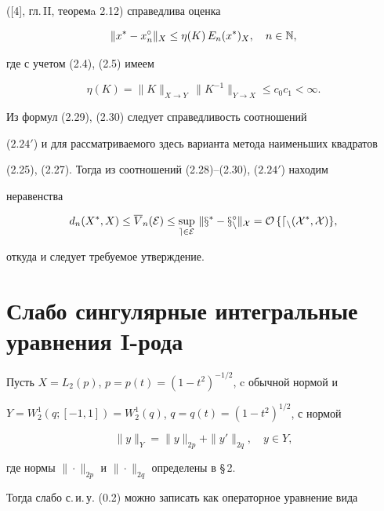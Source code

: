 ([4], гл.\,II, теоремa 2.12) справедлива оценка


\begin{equation}


\|x^*-x_n^\circ\|_X \leq \eta(K)\, E_n(x^*)_X,\quad n\in \Bbb N,


\end{equation}


где с учетом (2.4), (2.5) имеем


\begin{equation}


\eta(K)=\|K\|_{X\rightarrow Y}\, \|K^{-1}\|_{Y\rightarrow X}


\leq c_0 c_1<\infty .


\end{equation}


Из формул (2.29), (2.30) следует справедливость соотношений


($2.24'$) и для рассматриваемого здесь варианта метода наименьших квадратов


(2.25), (2.27). Тогда из соотношений (2.28)--(2.30), ($2.24'$) находим


неравенства


$$


d_n(X^*,X)\leq \overline{V}_n(\cal E)\leq \sup_{e\in \cal E}\,


\|x^*-x_n^\circ\|_X =O\, \{ d_n(X^*,X)\} ,


$$


откуда и следует требуемое утверждение.


\addtocounter{footnote}{-1}





\section{Слабо сингулярные интегральные уравнения I-рода}





Пусть $X=L_2(p)$, $p=p(t)=(1-t^2)^{-1/2}$, c обычной нормой и


$Y=W_2^1(q;[-1,1])=W_2^1(q)$, $q=q(t)=(1-t^2)^{1/2}$, с нормой


$$


\|y\|_Y =\|y\|_{2p}+\|y'\|_{2q},\quad y\in Y,


$$


где нормы $\|\cdot\|_{2p}$ и $\|\cdot\|_{2q}$ определены в \S\,2.


Тогда слабо с.\,и.\,у. (0.2) можно записать как операторное уравнение вида


